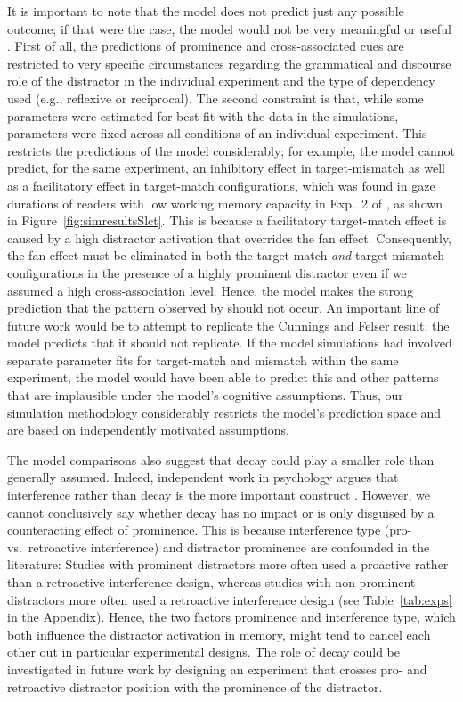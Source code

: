 \documentclass{cambridge7A}\usepackage[]{graphicx}\usepackage[]{color}
\begin{document}
It is important to note that the model does not predict just any possible outcome; if that were the case, the model would not be very meaningful or useful \citep{rp}.
First of all, the predictions of prominence and cross-associated cues are restricted to very specific circumstances regarding the grammatical and discourse role of the distractor in the individual experiment and the type of dependency used (e.g., reflexive or reciprocal).
The second constraint is that, while some parameters were estimated for best fit with the data in the simulations, parameters were fixed across all conditions of an individual experiment.
This restricts the predictions of the model considerably; for example, the model cannot predict, for the same experiment, an  inhibitory effect in target-mismatch as well as a  facilitatory effect in target-match configurations, which was found in gaze durations of readers with low working memory capacity in Exp.~2 of \cite{CunningsFelser2013},  as shown in Figure~\ref{fig:simresultsSlct}. 
This is because a facilitatory target-match effect is caused by a high  distractor activation that overrides the  fan effect. Consequently, the fan effect must be eliminated in both the target-match \textit{and} target-mismatch configurations in the presence of a highly prominent distractor even if we assumed a high cross-association level.
Hence, the model makes the strong prediction that the pattern observed by \cite{CunningsFelser2013} should not occur. An important line of future work would be to attempt to replicate the Cunnings and Felser result; the model predicts that it should not replicate. If the model simulations had involved separate parameter fits for target-match and mismatch within the same experiment, the model would have been able to predict this and other patterns that are implausible under the model's cognitive assumptions. Thus, our simulation methodology  considerably restricts the model's prediction space and are based on independently motivated assumptions.

The model comparisons also suggest that  decay could play a smaller role than generally assumed. Indeed, independent work in psychology argues that interference rather than decay is the more important construct  \citep{OberauerLewandowsky2014,OberauerLewandowsky2013,berman2009search}. 
However, we cannot conclusively say whether decay has no impact or is only disguised by a counteracting effect of prominence. This is because interference type (pro- vs.\ retroactive interference) and distractor prominence are confounded in the literature:
Studies with prominent distractors more often used a proactive rather than a retroactive interference design, whereas studies with non-prominent distractors more often used a retroactive interference design (see Table~\ref{tab:exps} in the Appendix).
Hence, the two factors prominence and interference type, which both influence the distractor activation in memory, might tend to cancel each other out in particular experimental designs. 
The role of decay could be investigated in future work by designing an experiment that crosses pro- and retroactive distractor position with the prominence of the distractor.
\end{document}
